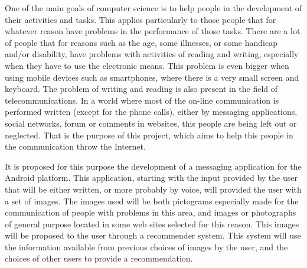 One of the main goals of computer science is to help people in the development of their activities and tasks. This applies particularly to those people that for whatever reason have problems in the performance of those tasks. There are a lot of people that for reasons such as the age, some illnesses, or some handicap and/or disability, have problems with activities of reading and writing, especially when they have to use the electronic means. This problem is even bigger when using mobile devices such as smartphones, where there is a very small screen and keyboard. The problem of writing and reading is also present in the field of telecommunications. In a world where most of the on-line communication is performed written (except for the phone calls), either by messaging applications, social networks, forum or comments in websites, this people are being left out or neglected. That is the purpose of this project,  which aims to help this people in the communication throw the Internet.

It is proposed for this purpose the development of a messaging application for the Android platform. This application, starting with the input provided by the user that will be either written, or more probably by voice, will provided the user with a set of images. The images used will be both pictograms especially made for the communication of people with problems in this area, and images or photographs of general purpose located in some web sites selected for this reason. This images will be proposed  to the user through a recommender system. This system will use the information available from previous choices of images by the user, and the choices of other users to provide a recommendation.